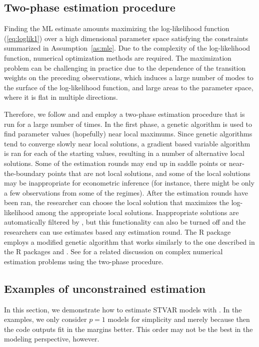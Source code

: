 \documentclass[nojss]{jss}
\begin{document}
\subsection{Two-phase estimation procedure}\label{sec:estimscheme}
Finding the ML estimate amounts maximizing the log-likelihood function (\ref{eq:loglik1}) over a high dimensional parameter space satisfying the constraints summarized in Assumption~\ref{as:mle}. Due to the complexity of the log-likelihood function, numerical optimization methods are required. The maximization problem can be challenging in practice due to the dependence of the transition weights on the preceding observations, which induces a large number of modes to the surface of the log-likelihood function, and large areas to the parameter space, where it is flat in multiple directions.

Therefore, we follow \cite{Meitz+Preve+Saikkonen:2023} and \cite{Virolainen:2022} and employ a two-phase estimation procedure that is run for a large number of times. In the first phase, a genetic algorithm is used to find parameter values (hopefully) near local maximums. Since genetic algorithms tend to converge slowly near local solutions, a gradient based variable algorithm \cite[algorithm 21, implemented by \citealp{R}]{Nash:1990} is ran for each of the starting values, resulting in a number of alternative local solutions. Some of the estimation rounds may end up in saddle points or near-the-boundary points that are not local solutions, and some of the local solutions may be  inappropriate for econometric inference (for instance, there might be only a few observations from some of the regimes). After the estimation rounds have been ran, the researcher can choose the local solution that maximizes the log-likelihood among the appropriate local solutions. Inappropriate solutions are automatically filtered by , but this functionality can also be turned off and the researchers can use estimates based any estimation round. The R package  employs a modified genetic algorithm that works similarly to the one described in the R packages  \citep{uGMAR} and  \citep{gmvarkit} \citep[the genetic algorithm and implemented in former is briefly described in][]{Virolainen:2022}. See \citet[Chapter~3]{Virolainen2:2022} for a related discussion on complex numerical estimation problems using the two-phase procedure.

\subsection{Examples of unconstrained estimation}\label{sec:example_estim}
In this section, we demonstrate how to estimate STVAR models with . In the examples, we only consider $p=1$ models for simplicity and merely because then the code outputs fit in the margins better. This order may not be the best in the modeling perspective, however.
\end{document}
